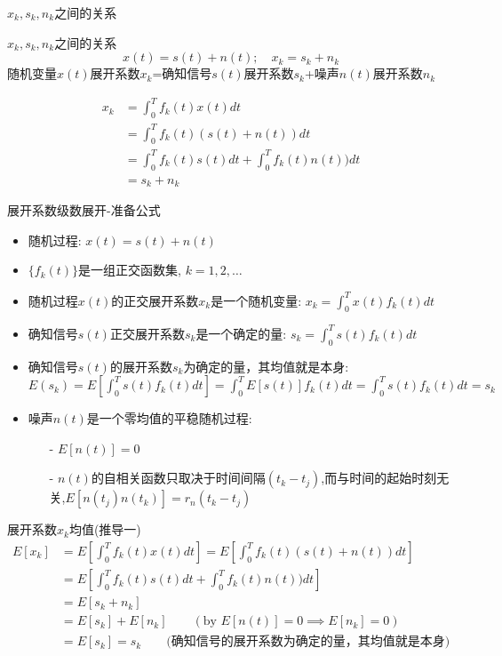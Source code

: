 \begin{frame}{$x_k,s_k,n_k$之间的关系}
\begin{block}{$x_k,s_k,n_k$之间的关系}
	\[x(t)=s(t)+n(t); \quad x_k=s_k+n_k \]
	随机变量$x(t)$展开系数$x_k$=确知信号$s(t)$展开系数$s_k$+噪声$n(t)$展开系数$n_k$
\end{block}
\begin{align*}
x_k&=\int_{0}^{T}f_k(t)x(t)dt\\
&=\int_{0}^{T}f_k(t)(s(t)+n(t))dt\\
&=\int_{0}^{T}f_k(t)s(t)dt+\int_{0}^{T}f_k(t)n(t))dt\\
&=s_k+n_k
\end{align*}
\end{frame}

\begin{frame}{展开系数级数展开-准备公式}
\begin{itemize}
	\item 随机过程: $x(t)=s(t)+n(t)$
	\item $\{f_k(t)\}$是一组正交函数集, $k=1,2,\dots$
	\item 随机过程$x(t)的$正交展开系数$x_k$是一个随机变量: $x_k=\int_{0}^{T}x(t)f_k(t)dt$
	\item 确知信号$s(t)$正交展开系数$s_k$是一个确定的量: $s_k=\int_{0}^{T}s(t)f_k(t)dt$
	\item 确知信号$s(t)$的展开系数$s_k$为确定的量，其均值就是本身: $E(s_k)=E\left[\int_{0}^{T}s(t)f_k(t)dt\right]=\int_{0}^{T}E[s(t)]f_k(t)dt=\int_{0}^{T}s(t)f_k(t)dt=s_k$
	\item 噪声$n(t)$是一个零均值的平稳随机过程:
	\begin{itemize}
		\item[-] $E[n(t)]=0$
		\item[-]  $n(t)$的自相关函数只取决于时间间隔$(t_k-t_j)$,而与时间的起始时刻无关,$E[n(t_j)n(t_k)]=r_n(t_k-t_j)$
	\end{itemize}
\end{itemize}
\end{frame}

\begin{frame}{展开系数$x_k$均值(推导一)}
\begin{align*}
E[x_k]&=E\left[\int_{0}^{T}f_k(t)x(t)dt\right]=E\left[\int_{0}^{T}f_k(t)(s(t)+n(t))dt\right]\\
&=E\left[\int_{0}^{T}f_k(t)s(t)dt+\int_{0}^{T}f_k(t)n(t))dt\right]\\
&=E[s_k+n_k]\\
&=E[s_k]+E[n_k]\qquad (\text{by }E[n(t)]=0\implies E[n_k]=0)\\
&= E[s_k] = s_k\qquad \text{(确知信号的展开系数为确定的量，其均值就是本身)}
\end{align*}
\end{frame}

